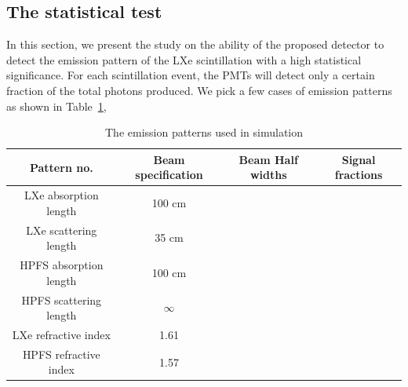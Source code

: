 \subsection{The statistical test}
\label{subsec:StatAnalysis}
In this section, we present the study on the ability of the proposed detector to detect the emission pattern 
of the LXe scintillation with a high statistical significance. For each scintillation event, the PMTs 
will detect only a certain fraction of the total photons produced. We pick a few cases of emission 
patterns as shown in Table~\ref{tab:emissionpattern},

\begin{table}[h]
  \centering
  \caption{The emission patterns used in simulation}
  \label{tab:emissionpattern}
  \begin{tabular}{|c|c|c|c|}
  \hline
  Pattern no. & Beam specification & Beam Half widths & Signal fractions\\
  \hline
  LXe absorption length & 100 cm\\
  \hline
  LXe scattering length & 35 cm\\
  \hline
  HPFS absorption length & 100 cm\\
  \hline
  HPFS scattering length & $\infty$ \\
  \hline
  LXe refractive index & 1.61 \\
  \hline
  HPFS refractive index & 1.57 \\
  \hline
  \end{tabular}
\end{table}